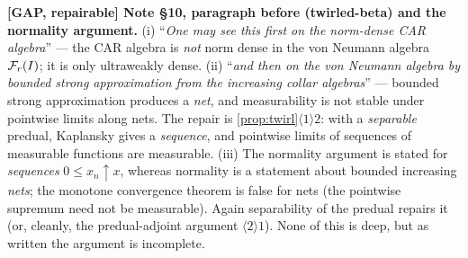 \documentclass[11pt]{article}
\begin{document}
\lproof
{}

\begin{verdictgap}
\textbf{[GAP, repairable] Note \S10, paragraph before (twirled-beta) and the
normality argument.}
(i) ``\emph{One may see this first on the norm-dense CAR algebra}'' --- the CAR
algebra is \emph{not} norm dense in the von Neumann algebra $\mathcal F_r(I)$; it is
only ultraweakly dense. (ii) ``\emph{and then on the von Neumann algebra by
bounded strong approximation from the increasing collar algebras}'' --- bounded
strong approximation produces a \emph{net}, and measurability is not stable
under pointwise limits along nets. The repair is
\cref{prop:twirl}$\langle1\rangle2$: with a \emph{separable} predual, Kaplansky
gives a \emph{sequence}, and pointwise limits of sequences of measurable
functions are measurable. (iii) The normality argument is stated for
\emph{sequences} $0\le x_n\uparrow x$, whereas normality is a statement about
bounded increasing \emph{nets}; the monotone convergence theorem is false for
nets (the pointwise supremum need not be measurable). Again separability of the
predual repairs it (or, cleanly, the predual-adjoint argument
$\langle2\rangle1$). None of this is deep, but as written the argument is
incomplete.
\end{verdictgap}
\end{document}

